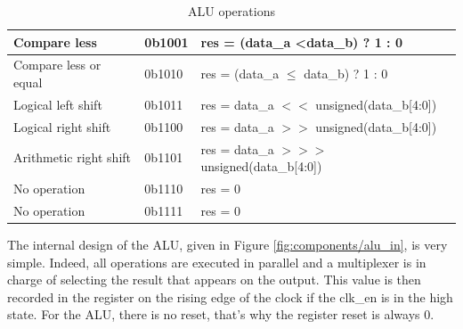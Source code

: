 \begin{table}[ht]
\begin{tabular}{|l|l|l|}
    Compare less                                                     & 0b1001                                                      & res = (data\_a \textless data\_b) ? 1 : 0                      \\ \hline
    Compare less or equal                                            & 0b1010                                                      & res = (data\_a $\leq$ data\_b) ? 1 : 0                   \\ \hline
    Logical left shift                                               & 0b1011                                                      & res = data\_a $<<$ unsigned(data\_b[4:0])                     \\ \hline
    Logical right shift                                              & 0b1100                                                      & res = data\_a $>>$ unsigned(data\_b[4:0])               \\ \hline
    Arithmetic right shift                                           & 0b1101                                                      & res = data\_a $>>>$ unsigned(data\_b[4:0]) \\ \hline
    No operation                                                     & 0b1110                                                      & res = 0                                                        \\ \hline
    No operation                                                     & 0b1111                                                      & res = 0                                                        \\ \hline
    \end{tabular}
    \caption{ALU operations}
    \label{tab:alu/alufn}
\end{table}

The internal design of the ALU, given in Figure \ref{fig:components/alu_in}, is very 
simple. Indeed, all operations are executed in parallel and a multiplexer is in charge of 
selecting the result that appears on the output. This value is then recorded in the 
register on the rising edge of the clock if the clk\_en is in the high state. For the ALU, there is 
no reset, that's why the register reset is always 0.

